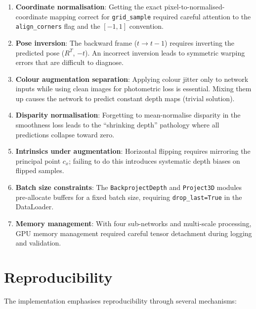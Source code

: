 \documentclass[10pt, a4paper, twocolumn]{article}
\begin{document}
\begin{enumerate}[noitemsep]
    \item \textbf{Coordinate normalisation}: Getting the exact pixel-to-normalised-coordinate mapping correct for \texttt{grid\_sample} required careful attention to the \texttt{align\_corners} flag and the $[-1, 1]$ convention.

    \item \textbf{Pose inversion}: The backward frame ($t \to t{-}1$) requires inverting the predicted pose ($R^T$, $-t$). An incorrect inversion leads to symmetric warping errors that are difficult to diagnose.

    \item \textbf{Colour augmentation separation}: Applying colour jitter only to network inputs while using clean images for photometric loss is essential. Mixing them up causes the network to predict constant depth maps (trivial solution).

    \item \textbf{Disparity normalisation}: Forgetting to mean-normalise disparity in the smoothness loss leads to the ``shrinking depth'' pathology where all predictions collapse toward zero.

    \item \textbf{Intrinsics under augmentation}: Horizontal flipping requires mirroring the principal point $c_x$; failing to do this introduces systematic depth biases on flipped samples.

    \item \textbf{Batch size constraints}: The \texttt{BackprojectDepth} and \texttt{Project3D} modules pre-allocate buffers for a fixed batch size, requiring \texttt{drop\_last=True} in the DataLoader.

    \item \textbf{Memory management}: With four sub-networks and multi-scale processing, GPU memory management required careful tensor detachment during logging and validation.
\end{enumerate}

\section{Reproducibility}
\label{sec:reproducibility}

The implementation emphasises reproducibility through several mechanisms:
\end{document}
